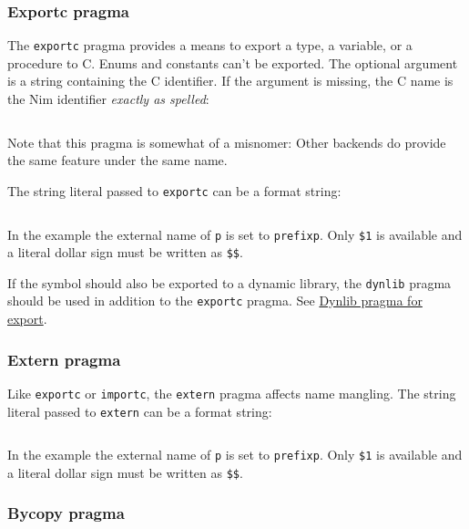 \hypertarget{exportc-pragma}{%
\subsubsection{Exportc pragma}\label{exportc-pragma}}

The \texttt{exportc} pragma provides a means to export a type, a
variable, or a procedure to C. Enums and constants can't be exported.
The optional argument is a string containing the C identifier. If the
argument is missing, the C name is the Nim identifier \emph{exactly as
spelled}:

\begin{verbatim}
\end{verbatim}

Note that this pragma is somewhat of a misnomer: Other backends do
provide the same feature under the same name.

The string literal passed to \texttt{exportc} can be a format string:

\begin{verbatim}
\end{verbatim}

In the example the external name of \texttt{p} is set to
\texttt{prefixp}. Only \texttt{\$1} is available and a literal dollar
sign must be written as \texttt{\$\$}.

If the symbol should also be exported to a dynamic library, the
\texttt{dynlib} pragma should be used in addition to the
\texttt{exportc} pragma. See
\protect\hyperlink{foreign-function-interface-dynlib-pragma-for-export}{Dynlib
pragma for export}.

\hypertarget{extern-pragma}{%
\subsubsection{Extern pragma}\label{extern-pragma}}

Like \texttt{exportc} or \texttt{importc}, the \texttt{extern} pragma
affects name mangling. The string literal passed to \texttt{extern} can
be a format string:

\begin{verbatim}
\end{verbatim}

In the example the external name of \texttt{p} is set to
\texttt{prefixp}. Only \texttt{\$1} is available and a literal dollar
sign must be written as \texttt{\$\$}.

\hypertarget{bycopy-pragma}{%
\subsubsection{Bycopy pragma}\label{bycopy-pragma}}

